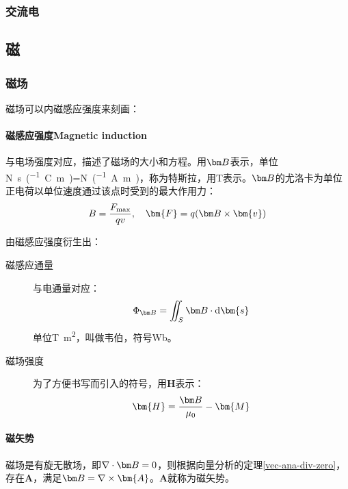 \subsubsection{交流电}

\subsection{磁}
\subsubsection{磁场}
磁场可以内磁感应强度来刻画：

\paragraph*{磁感应强度Magnetic induction} 与电场强度对应，描述了磁场的大小和方程。用$\bB$表示，单位\si{\N\s\per(\coulomb\m)}=\si{\N\per(\ampere\m)}，称为特斯拉，用\si{\tesla}表示。$\bB$的尤洛卡为单位正电荷以单位速度通过该点时受到的最大作用力：
$$B=\frac{F_{\max}}{qv},\quad \bm{F}=q(\bB\times\bm{v})$$

由磁感应强度衍生出：
\begin{description}
\item[磁感应通量]\label{magnetic-induction-flux} 与电通量对应：
$$\Phi_{\bB}=\iint_S\bB\cdot\dif \bm{s}$$
单位\si{\tesla\square\m}，叫做韦伯，符号\si{\weber}。
\item[磁场强度] 为了方便书写而引入的符号，用$\bm{H}$表示：
$$\bm{H}=\frac{\bB}{\mu_0}-\bm{M}$$
\end{description}

\paragraph*{磁矢势}磁场是有旋无散场，即$\nabla\cdot \bB=0$，则根据向量分析的定理\ref{vec-ana-div-zero}，存在$\bm{A}$，满足$\bB=\nabla \times \bm{A}$。$\bm{A}$就称为磁矢势。

